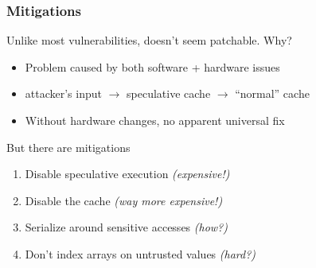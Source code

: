 \documentclass[10pt]{beamer}
\begin{document}
\begin{frame}

\frametitle{Mitigations}

Unlike most vulnerabilities, doesn't seem patchable. Why? \pause
\begin{itemize}
\item Problem caused by both software + hardware issues \pause
\item attacker's input $\rightarrow$ speculative cache $\rightarrow$ ``normal'' cache
\item Without hardware changes, no apparent universal fix\\[1em]
\end{itemize}

\pause
But there are mitigations
\begin{enumerate}
  \pause\item Disable speculative execution \emph{(expensive!)}
  \pause\item Disable the cache \emph{(way more expensive!)}
  \pause\item Serialize around sensitive accesses \emph{(how?)}
  \pause\item Don't index arrays on untrusted values \emph{(hard?)}
\end{enumerate}

\end{frame}





\end{document}

